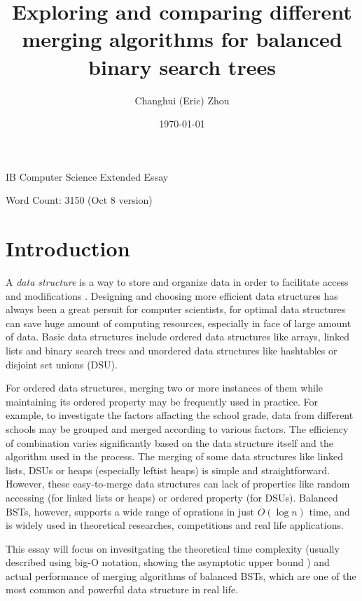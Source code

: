 \documentclass[12pt]{article}
\title{\textbf{Exploring and comparing different merging algorithms for balanced binary search trees}}
\author{Changhui (Eric) Zhou}
\date{\today}
\begin{document}
\begin{titlepage}
    \maketitle
    \centering 

    IB Computer Science Extended Essay

    Word Count: 3150 (Oct 8 version)
\end{titlepage}

\tableofcontents
\clearpage

\section{Introduction}

A \textit{data structure} is a way to store and organize data in order to facilitate access and modifications \cite{CLRS}. Designing and choosing more efficient data structures has always been a great persuit for computer scientists, for optimal data structures can save huge amount of computing resources, especially in face of large amount of data. Basic data structures include ordered data structures like arrays, linked lists and binary search trees and unordered data structures like hashtables or disjoint set unions (DSU). 

For ordered data structures, merging two or more instances of them while maintaining its ordered property may be frequently used in practice. For example, to investigate the factors affacting the school grade, data from different schools may be grouped and merged according to various factors. The efficiency of combination varies significantly based on the data structure itself and the algorithm used in the process.  The merging of some data structures like linked lists, DSUs or heaps (especially leftist heaps) is simple and straightforward. However, these easy-to-merge data structures can lack of properties like random accessing (for linked lists or heaps) or ordered property (for DSUs). Balanced BSTs, however, supports a wide range of oprations in just $O(\log n)$ time, and is widely used in theoretical researches, competitions and real life applications.

This essay will focus on invesitgating the theoretical time complexity (usually described using big-O notation, showing the asymptotic upper bound \cite{CLRS}) and actual performance of merging algorithms of balanced BSTs, which are one of the most common and powerful data structure in real life. 
\end{document}
